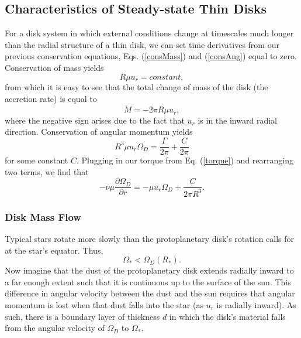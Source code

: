 \documentclass[aps,pra,twocolumn]{revtex4-1}
\begin{document}
\subsection{\label{section 2.2} Characteristics of Steady-state Thin Disks}
For a disk system in which external conditions change at timescales much longer than the radial structure of a thin disk, we can set time derivatives from our previous conservation equations, Eqs. (\ref{consMass}) and (\ref{consAng}) equal to zero.  Conservation of mass yields
\begin{equation}
R\mu u_r = constant, \nonumber
\end{equation}
from which it is easy to see that the total change of mass of the disk (the accretion rate) is equal to 
\begin{equation}
\dot{M} = -2\pi R \mu u_r, \label{modifiedMass1}
\end{equation}
where the negative sign arises due to the fact that $u_r$ is in the inward radial direction.  Conservation of angular momentum yields
\begin{equation}
R^3 \mu u_r \Omega_D = \frac{\Gamma}{2\pi} + \frac{C}{2\pi} \nonumber
\end{equation}
for some constant $C$.  Plugging in our torque from Eq. (\ref{torque}) and rearranging two terms, we find that \cite{king2002}
\begin{equation}
- \nu \mu \frac{\partial \Omega_D}{\partial r} = -\mu u_r \Omega_D  + \frac{C}{2\pi R^3 }. \label{modifiedAng1}
\end{equation}



\subsubsection{\label{section 2.2.1} Disk Mass Flow}
Typical stars rotate more slowly than the protoplanetary disk's rotation calls for at the star's equator.  Thus,
\begin{equation}
\Omega_* < \Omega_D(R_*).
\end{equation}
Now imagine that the dust of the protoplanetary disk extends radially inward to a far enough extent such that it is continuous up to the surface of the sun.  This difference in angular velocity between the dust and the sun requires that angular momentum is lost when that dust falls into the star (as $u_r$ is radially inward).  As such, there is a boundary layer of thickness $d$ in which the disk's material falls from the angular velocity of $\Omega_D$ to $\Omega_*$.  
\end{document}
